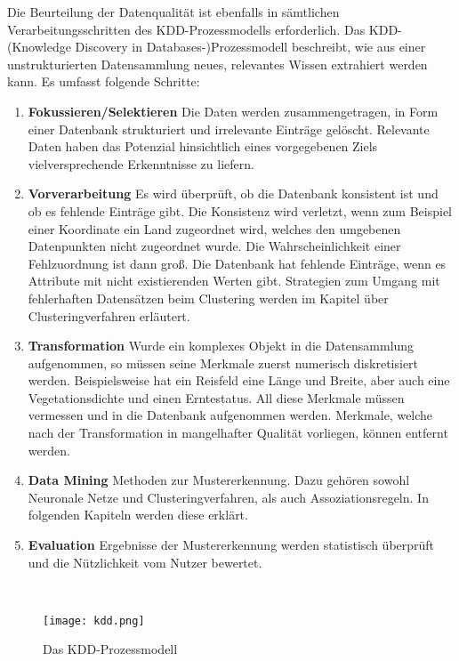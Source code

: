 \documentclass[11pt,fleqn]{book}
\begin{document}
Die Beurteilung der Datenqualität ist ebenfalls in sämtlichen Verarbeitungsschritten des KDD-Prozessmodells \cite{kddmod} erforderlich. Das KDD-(Knowledge Discovery in Databases-)Prozessmodell  beschreibt, wie aus einer unstrukturierten Datensammlung neues, relevantes Wissen extrahiert werden kann. Es umfasst folgende Schritte:
\begin{enumerate}
\item \textbf{Fokussieren/Selektieren} Die Daten werden zusammengetragen, in Form einer Datenbank strukturiert und irrelevante Einträge gelöscht. Relevante Daten haben das Potenzial hinsichtlich eines vorgegebenen Ziels vielversprechende Erkenntnisse zu liefern.
\item \textbf{Vorverarbeitung} Es wird überprüft, ob die Datenbank konsistent ist und ob es fehlende Einträge gibt. Die Konsistenz wird verletzt, wenn zum Beispiel einer Koordinate ein Land zugeordnet wird, welches den umgebenen Datenpunkten nicht zugeordnet wurde. Die Wahrscheinlichkeit einer Fehlzuordnung ist dann groß. Die Datenbank hat fehlende Einträge, wenn es Attribute mit nicht existierenden Werten gibt. Strategien zum Umgang mit fehlerhaften Datensätzen beim Clustering werden im Kapitel über Clusteringverfahren erläutert.
\item \textbf{Transformation} Wurde ein komplexes Objekt in die Datensammlung aufgenommen, so müssen seine Merkmale zuerst numerisch diskretisiert werden. Beispielsweise hat ein Reisfeld eine Länge und Breite, aber auch eine Vegetationsdichte und einen Erntestatus. All diese Merkmale müssen vermessen und in die Datenbank aufgenommen werden. Merkmale, welche nach der Transformation in mangelhafter Qualität vorliegen, können entfernt werden.
\item \textbf{Data Mining} Methoden zur Mustererkennung. Dazu gehören sowohl Neuronale Netze und Clusteringverfahren, als auch Assoziationsregeln. In folgenden Kapiteln werden diese erklärt.
\item \textbf{Evaluation} Ergebnisse der Mustererkennung werden statistisch überprüft und die Nützlichkeit vom Nutzer bewertet.
\end{enumerate}~\\


\begin{figure}[h]
\centering
\texttt{[image: kdd.png]}
\caption{Das KDD-Prozessmodell \protect\footnotemark}
\end{figure}
\end{document}
